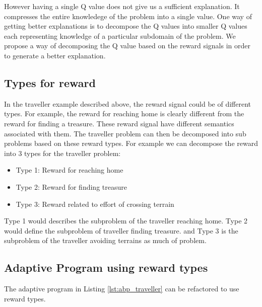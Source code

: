 \documentclass[conference]{IEEEtran}
\begin{document}
However having a single Q value does not give us a sufficient explanation. It compresses the entire knowledege
of the problem into a single value. One way of getting better explanations is to decompose the Q values into
smaller Q values each representing knowledge of a particular subdomain of the problem. We propose a way of decomposing
the Q value based on the reward signals in order to generate a better explanation.

\subsection{Types for reward}

In the traveller example described above, the reward signal could be of different types. For example, the reward
for reaching home is clearly different from the reward for finding a treasure. These reward signal have different
semantics associated with them. The traveller problem can then be decomposed into sub problems based on these reward
types. For example we can decompose the reward into 3 types for the traveller problem:
\begin{itemize}
  \item Type 1: Reward for reaching home
  \item Type 2: Reward for finding treasure
  \item Type 3: Reward related to effort of crossing terrain
\end{itemize}

Type 1 would describes the subproblem of the traveller reaching home. Type 2 would define the subproblem of traveller finding treasure.
and Type 3 is the subproblem of the traveller avoiding terrains as much of problem.

\subsection{Adaptive Program using reward types}

The adaptive program in Listing \ref{lst:abp_traveller} can be refactored to use reward types.
\end{document}
